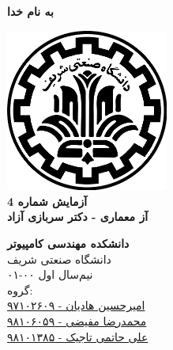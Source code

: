 \documentclass{article}
\begin{document}
\begin{titlepage}
	\begin{center}
		\textbf{ \Huge{به نام خدا}}
	
		\vspace{0.2cm}
		
		\includegraphics[width=0.4\textwidth]{sharif.png}\\
		\vspace{0.2cm}
		\textbf{ \Huge{آزمایش شماره 4}}\\
		\vspace{0.25cm}
		\textbf{ \Large{آز معماری - دکتر سربازی آزاد}}
		\vspace{0.2cm}
		
		
		\large \textbf{دانشکده مهندسی کامپیوتر}\\\vspace{0.1cm}
		\large   دانشگاه صنعتی شریف\\\vspace{0.2cm}
		\large   ﻧﯿﻢ‌سال اول ۰۰-۰۱ \\\vspace{0.10cm}
		\large{گروه:}\\
		\large{\href{mailto:a.h.hadian@gmail.com}{امیرحسین هادیان - ۹۷۱۰۲۶۰۹}}\\
		\large{\href{mailto:mofayezi.m@gmail.com}{محمدرضا مفیضی - ۹۸۱۰۶۰۵۹}}\\
		\large{\href{mailto:a.hatam008@gmail.com}{علی حاتمی تاجیک - ۹۸۱۰۱۳۸۵}}\\
	\end{center}
\end{titlepage}

\newpage

\pagestyle{fancy}
\fancyhf{}
\fancyfoot{}
\setlength{\headheight}{59pt}
\cfoot{\thepage}
\end{document}
